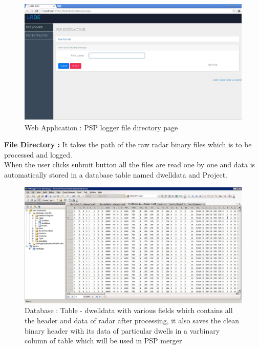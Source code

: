 \documentclass[14pt]{article} %
\begin{document}
   \begin{figure}[H]
   \includegraphics[width=\linewidth]{DirectoryPage.jpg}
  \caption{Web Application : PSP logger file directory page}
  \label{fig:figure 23}
\end{figure}  
\indent \textbf{File Directory :} It takes the path of the raw radar binary files which is to \indent be processed and logged.\\
When the user clicks submit button all the files are read one by one and data is automatically stored in a database table named dwelldata and Project.
 \begin{figure}[H]
\includegraphics[width=\linewidth]{database_table_data2.jpg}
  \caption[Database : Table - dwelldata]{Database : Table - dwelldata with various fields which contains all the header and data of radar after processing, it also saves the clean binary header with its data of particular dwells in a varbinary column of table which will be used in PSP merger }
  \label{fig:figure 24}
\end{figure}  
\end{document}
